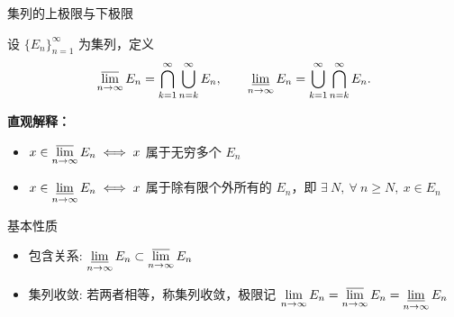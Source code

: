 \begin{frame}{集列的上极限与下极限}

\begin{Def}[上极限集与下极限集]
设 $\{E_n\}_{n=1}^{\infty}$ 为集列，定义
\[
\varlimsup_{n\to\infty} E_n = \bigcap_{k=1}^{\infty} \bigcup_{n=k}^{\infty} E_n,
\qquad
\varliminf_{n\to\infty} E_n = \bigcup_{k=1}^{\infty} \bigcap_{n=k}^{\infty} E_n.
\]
\end{Def}

\pause

\textbf{直观解释：}
\begin{itemize}
\item $\displaystyle x \in \varlimsup_{n\to\infty} E_n \iff x$ 属于\alert{无穷多个} $E_n$
\item $\displaystyle x \in \varliminf_{n\to\infty} E_n \iff x$ 属于\alert{除有限个外所有的} $E_n$，即 $\exists ~ N,\ \forall ~ n \geqslant N,\ x \in E_n$
\end{itemize}

\pause

\begin{block}{基本性质}
\begin{itemize}
\item \alert{包含关系}:  $\displaystyle \varliminf_{n\to\infty} E_n \subset \varlimsup_{n\to\infty} E_n$
\item \alert{集列收敛}: 若两者相等，称集列收敛，极限记 $\displaystyle \lim_{n\to\infty} E_n = \varlimsup_{n\to\infty} E_n = \varliminf_{n\to\infty} E_n$
\end{itemize}
\end{block}

\end{frame}


